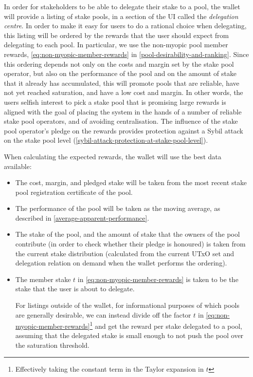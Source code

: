 \documentclass[11pt,a4paper,dvipsnames,twosided]{article}
\begin{document}
In order for stakeholders to be able to delegate their stake to a pool, the
wallet will provide a listing of stake pools, in a section of the UI called the
\emph{delegation centre}. In order to make it easy for users to do a rational
choice when delegating, this listing will be ordered by the rewards that the
user should expect from delegating to each pool. In particular, we use the
non-myopic pool member rewards, \cref{eq:non-myopic-member-rewards} in
\cref{pool-desirability-and-ranking}. Since this ordering depends not only on
the costs and margin set by the stake pool operator, but also on the performance
of the pool and on the amount of stake that it already has accumulated, this
will promote pools that are reliable, have not yet reached saturation, and have
a low cost and margin. In other words, the users selfish interest to pick a
stake pool that is promising large rewards is aligned with the goal of placing
the system in the hands of a number of reliable stake pool operators, and of
avoiding centralisation. The influence of the stake pool operator's pledge on
the rewards provides protection against a Sybil attack on the stake pool level
(\cref{sybil-attack-protection-at-stake-pool-level}).

When calculating the expected rewards, the wallet will use the
best data available:
\begin{itemize}
\item The cost, margin, and pledged stake will be taken from the most
  recent stake pool registration certificate of the pool.
\item The performance of the pool will be taken as the moving average, as
  described in \cref{average-apparent-performance}.
\item The stake of the pool, and the amount of stake that the owners
  of the pool contribute (in order to check whether their pledge is
  honoured) is taken from the current stake distribution (calculated
  from the current UTxO set and delegation relation on demand when the
  wallet performs the ordering).
\item The member stake \(t\) in \cref{eq:non-myopic-member-rewards} is taken to
  be the stake that the user is about to delegate.

  For listings outside of the wallet, for informational purposes of which pools
  are generally desirable, we can instead divide off the factor \(t\) in
  \cref{eq:non-myopic-member-rewards}\footnote{Effectively taking the constant
    term in the Taylor expansion in \(t\)} and get the reward per stake
  delegated to a pool, assuming that the delegated stake is small enough to not
  push the pool over the saturation threshold.
\end{itemize}
\end{document}
